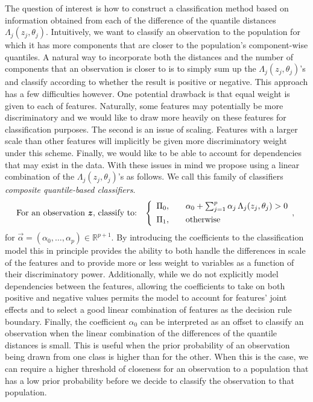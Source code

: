 The question of interest is how to construct a classification method based on
information obtained from each of the difference of the quantile distances
$\Lambda_j(z_j, \theta_j)$.  Intuitively, we want to classify an observation to
the population for which it has more components that are closer to the
population's component-wise quantiles.  A natural way to incorporate both the
distances and the number of components that an observation is closer to is to
simply sum up the $\Lambda_j(z_j, \theta_j)$'s and classify according to whether
the result is positive or negative.  This approach has a few difficulties
however.  One potential drawback is that equal weight is given to each of
features.  Naturally, some features may potentially be more discriminatory and
we would like to draw more heavily on these features for classification
purposes.  The second is an issue of scaling.  Features with a larger scale than
other features will implicitly be given more discriminatory weight under this
scheme.  Finally, we would like to be able to account for dependencies that may
exist in the data.  With these issues in mind we propose using a linear
combination of the $\Lambda_j(z_j, \theta_j)$'s as follows.  We call this family
of classifiers \emph{composite quantile-based classifiers}.
\begin{equation}
  \label{eq:composite-classifier}
  \text{For an observation $\vec{z}$, classify to:} \hspace{3mm}
  \left\{
    \begin{array}{lll}
      \Pi_0, & & %
                 \alpha_0 + \sum_{j=1}^p \alpha_j \,
                 \Lambda_j (z_j, \theta_j) > 0 \\[1ex]
      \Pi_1, & & \text{otherwise}
    \end{array} ,
  \right.
\end{equation}
for $\vec{\alpha} = (\alpha_0, \dots, \alpha_p) \in \mathbb{R}^{p+1}$.  By
introducing the coefficients to the classification model this in principle
provides the ability to both handle the differences in scale of the features and
to provide more or less weight to variables as a function of their
discriminatory power. Additionally, while we do not explicitly model
dependencies between the features, allowing the coefficients to take on both
positive and negative values permits the model to account for features' joint
effects and to select a good linear combination of features as the decision rule
boundary.  Finally, the coefficient $\alpha_0$ can be interpreted as an offset
to classify an observation when the linear combination of the differences of the
quantile distances is small.  This is useful when the prior probability of an
observation being drawn from one class is higher than for the other.  When this
is the case, we can require a higher threshold of closeness for an observation
to a population that has a low prior probability before we decide to classify
the observation to that population.


